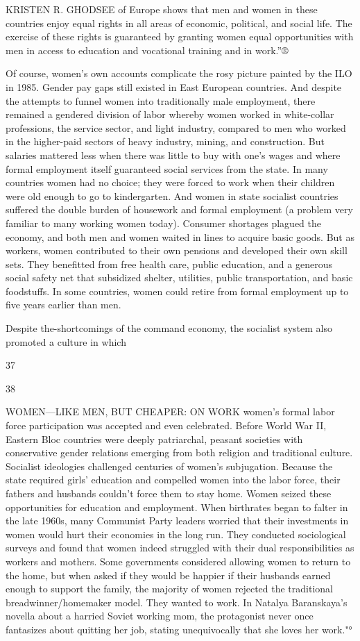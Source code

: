  \par 
KRISTEN R. GHODSEE of Europe shows that men and women in these countries enjoy equal rights in all areas of economic, political, and social life. The exercise of these rights is guaranteed by granting women equal opportunities with men in access to education and vocational training and in work.”®
 \par 
Of course, women’s own accounts complicate the rosy picture painted by the ILO in 1985. Gender pay gaps still existed in East European countries. And despite the attempts to funnel women into traditionally male employment, there remained a gendered division of labor whereby women worked in white-collar professions, the service sector, and light industry, compared to men who worked in the higher-paid sectors of heavy industry, mining, and construction. But salaries mattered less when there was little to buy with one’s wages and where formal employment itself guaranteed social services from the state. In many countries women had no choice; they were forced to work when their children were old enough to go to kindergarten. And women in state socialist countries suffered the double burden of housework and formal employment (a problem very familiar to many working women today). Consumer shortages plagued the economy, and both men and women waited in lines to acquire basic goods. But as workers, women contributed to their own pensions and developed their own skill sets. They benefitted from free health care, public education, and a generous social safety net that subsidized shelter, utilities, public transportation, and basic foodstuffs. In some countries, women could retire from formal employment up to five years earlier than men.
 \par 
Despite the-shortcomings of the command economy, the socialist system also promoted a culture in which
 \par 
37
 \par 
38
 \par 
WOMEN—LIKE MEN, BUT CHEAPER: ON WORK women’s formal labor force participation was accepted and even celebrated. Before World War II, Eastern Bloc countries were deeply patriarchal, peasant societies with conservative gender relations emerging from both religion and traditional culture. Socialist ideologies challenged centuries of women’s subjugation. Because the state required girls’ education and compelled women into the labor force, their fathers and husbands couldn't force them to stay home. Women seized these opportunities for education and employment. When birthrates began to falter in the late 1960s, many Communist Party leaders worried that their investments in women would hurt their economies in the long run. They conducted sociological surveys and found that women indeed struggled with their dual responsibilities as workers and mothers. Some governments considered allowing women to return to the home, but when asked if they would be happier if their husbands earned enough to support the family, the majority of women rejected the traditional breadwinner/homemaker model. They wanted to work. In Natalya Baranskaya’s novella about a harried Soviet working mom, the protagonist never once fantasizes about quitting her job, stating unequivocally that she loves her work."°
